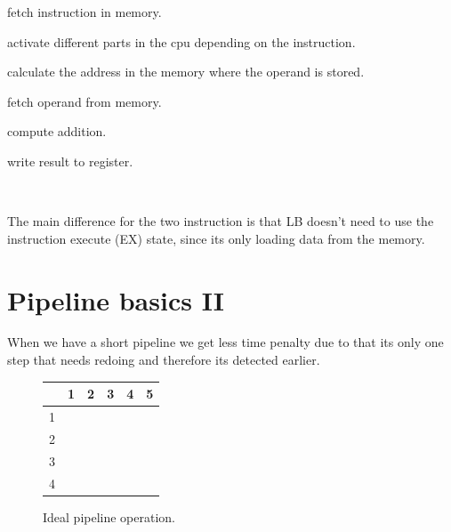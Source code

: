 \documentclass[titlepage, a4paper]{article}
\begin{document}
\begin{description}[leftmargin=!,labelwidth=\widthof{\bfseries WB}]
\item[ADD instruction]
\item[IF] fetch instruction in memory.
\item[DA] activate different parts in the cpu depending on the instruction.
\item[CO] calculate the address in the memory where the operand is stored. 
\item[FO] fetch operand from memory.
\item[EX] compute addition.
\item[WB] write result to register.
\end{description}
~\newline

The main difference for the two instruction is that LB doesn't need to use the instruction execute (EX) state, since its only loading data from the memory.

\section{Pipeline basics II}
When we have a short pipeline we get less time penalty due to that its only one step that needs redoing and therefore its detected earlier. \\

\begin{figure}[H]
  \centering
  \begin{tabular}{|c|c|c|c|c|c|}
    \hline
        {} & {1} & {2} & {3} & {4} & {5} \\ \hline
        {1} & \cellcolor{blue!25}{IF} & \cellcolor{orange!25}{EX} & {} & {} & {} \\ \hline
        {2} & {} & \cellcolor{blue!25}{IF} & \cellcolor{orange!25}{EX} & {} & {} \\ \hline
        {3} & {} & {} & \cellcolor{blue!25}{IF} & \cellcolor{orange!25}{EX} & {} \\ \hline
        {4} & {} & {} & {} & \cellcolor{blue!25}{IF} & \cellcolor{orange!25}{EX} \\ \hline
  \end{tabular}
  \caption{Ideal pipeline operation.}
  \label{fig:ideal_pipe_op}
\end{figure}
\end{document}
